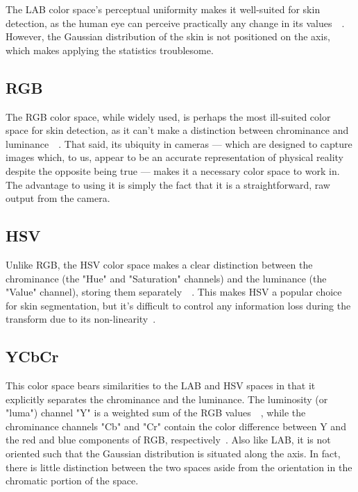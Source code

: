 The LAB color space's perceptual uniformity makes it well-suited for skin detection, as the human eye can perceive practically any change in its values~\cite{Vezhnevets2003}~\cite{Poynton1997}. However, the Gaussian distribution of the skin is not positioned on the axis, which makes applying the statistics troublesome.

\subsection{RGB}\label{sec:RGB}

The RGB color space, while widely used, is perhaps the most ill-suited color space for skin detection, as it can't make a distinction between chrominance and luminance~\cite{Vezhnevets2003}~\cite{Brand2000a}. That said, its ubiquity in cameras --- which are designed to capture images which, to us, appear to be an accurate representation of physical reality despite the opposite being true --- makes it a necessary color space to work in. The advantage to using it is simply the fact that it is a straightforward, raw output from the camera.

\subsection{HSV}\label{sec:HSV}

Unlike RGB, the HSV color space makes a clear distinction between the chrominance (the "Hue" and "Saturation" channels) and the luminance (the "Value" channel), storing them separately~\cite{Vezhnevets2003}~\cite{Sigal2000a}. This makes HSV a popular choice for skin segmentation, but it's difficult to control any information loss during the transform due to its non-linearity~\cite{Poynton1997}.

\subsection{YCbCr}\label{sec:YCbCr}

This color space bears similarities to the LAB and HSV spaces in that it explicitly separates the chrominance and the luminance. The luminosity (or "luma") channel "Y" is a weighted sum of the RGB values~\cite{Poynton1997}~\cite{Phung2002a}, while the chrominance channels "Cb" and "Cr" contain the color difference between Y and the red and blue components of RGB, respectively~\cite{Vezhnevets2003}. Also like LAB, it is not oriented such that the Gaussian distribution is situated along the axis. In fact, there is little distinction between the two spaces aside from the orientation in the chromatic portion of the space.

